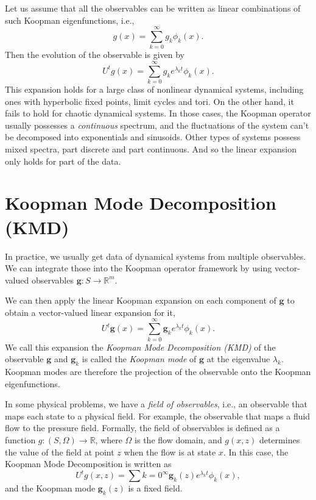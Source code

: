 \documentclass{article}
\def\R{\mathbb{R}}
\def\g{\mathbf{g}}
\begin{document}
Let us assume that all the observables can be written as linear combinations of
such Koopman eigenfunctions, i.e.,
\begin{equation}
    g(x) = \sum_{k=0}^{\infty}g_k \phi_k(x).
\end{equation}
Then the evolution of the observable is given by
\begin{equation}
    U^t g(x) = \sum_{k=0}^{\infty}g_k e^{\lambda_k t} \phi_k(x).
\end{equation}
This expansion holds for a large class of nonlinear dynamical systems,
including ones with hyperbolic fixed points, limit cycles and tori.
On the other hand, it fails to hold for chaotic dynamical systems.
In those cases, the Koopman operator usually possesses a \textit{continuous}
spectrum, and the fluctuations of the system can't be decomposed into
exponentials and sinusoids.
Other types of systems possess mixed spectra, part discrete and part continuous.
And so the linear expansion only holds for part of the data.

\section{Koopman Mode Decomposition (KMD)}%
\label{sec:koopman_mode_decomposition_kmd_}

In practice, we usually get data of dynamical systems from multiple
observables.
We can integrate those into the Koopman operator framework by using
vector-valued observables $\g:S\to \R^m$.

We can then apply the linear Koopman expansion on each component of $\g$
to obtain a vector-valued linear expansion for it,
\begin{equation}
    U^t \g(x) = \sum_{k=0}^{\infty} \g_k e^{\lambda_k t}\phi_k(x).
\end{equation}
We call this expansion the \textit{Koopman Mode Decomposition (KMD)} of the
observable $\g$ and $\g_k$ is called the \textit{Koopman mode} of $\g$ at the
eigenvalue $\lambda_k$.
Koopman modes are therefore the projection of the observable onto the Koopman
eigenfunctions.

In some physical problems, we have a \textit{field of observables}, i.e., an
observable that maps each state to a physical field.
For example, the observable that maps a fluid flow to the pressure field.
Formally, the field of observables is defined as a function $g:(S, \Omega)\to
\R$, where $\Omega$ is the flow domain, and $g(x,z)$ determines the value of
the field at point $z$ when the flow is at state $x$.
In this case, the Koopman Mode Decomposition is written as
\begin{equation}
    U^t g(x, z) = \sum{k=0}^{\infty} \g_k(z) e^{\lambda_k t}\phi_k(x),
\end{equation}
and the Koopman mode $\g_k(z)$ is a fixed field.
\end{document}
